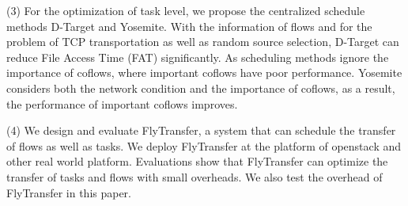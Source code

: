 \begin{eabstract}
(3) For the optimization of task level,
we propose the centralized schedule methods D-Target and Yosemite.
With the information of flows and for the problem of TCP transportation as well as random source selection,
D-Target can reduce File Access Time (FAT) significantly.
As scheduling methods ignore the importance of coflows, where important coflows have poor performance.
Yosemite considers both the network condition and the importance of coflows, as a result,
the performance of important coflows improves.
 

(4) We design and evaluate FlyTransfer, a system that can schedule the transfer of flows as well as tasks. 
We deploy FlyTransfer at the platform of openstack and other real world platform.
Evaluations show that FlyTransfer can optimize the transfer of tasks and flows with small overheads.
We also test the overhead of FlyTransfer in this paper.
  
  
\end{eabstract}

